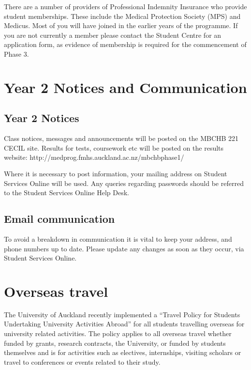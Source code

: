 \documentclass[11pt,fleqn]{book} %
\begin{document}
There are a number of providers of Professional Indemnity Insurance who provide student memberships. These include the Medical Protection Society (MPS) and Medicus.  Most of you will have joined in the earlier years of the programme.  If you are not currently a member please contact the Student Centre for an application form, as evidence of membership is required for the commencement of Phase 3.



\section{Year 2 Notices and Communication}

\subsection{Year 2 Notices}

Class notices, messages and announcements will be posted on the MBCHB 221 CECIL site.  Results for tests, coursework etc will be posted on the results website:
http://medprog.fmhs.auckland.ac.nz/mbchbphase1/

Where it is necessary to post information, your mailing address on Student Services Online will be used.  Any queries regarding passwords should be referred to the Student Services Online Help Desk.


\subsection{Email communication}

\begin{remark}
To avoid a breakdown in communication it is vital to keep your address, and phone numbers up to date.  Please update any changes as soon as they occur, via Student Services Online.
\end{remark}

\section{Overseas travel}

The University of Auckland recently implemented a ``Travel Policy for Students Undertaking University Activities Abroad'' for all students travelling overseas for university related activities. The policy applies to all overseas travel whether funded by grants, research contracts, the University, or funded by students themselves and is for activities such as electives, internships, visiting scholars or travel to conferences or events related to their study.
\end{document}

